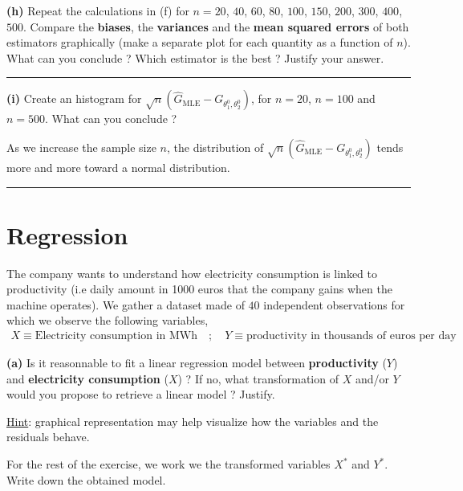 \documentclass[10pt, a4paper, nofootinbib]{scrartcl}
\begin{document}
\textbf{(h)} Repeat the calculations in (f) for $n = 20$, $40$, $60$, $80$, $100$, $150$, $200$, $300$, $400$, $500$. Compare the \textbf{biases}, the \textbf{variances} and the \textbf{mean squared errors} of both estimators graphically (make a separate plot for each quantity as a function of $n$). What can you conclude ? Which estimator is the best ? Justify your answer.

\begin{center}\rule{6cm}{0.4pt}\end{center}

\textbf{(i)} Create an histogram for $\sqrt{n}(\hat{G}_{\text{MLE}} - G_{\theta_1^0, \theta_2^0})$, for $n = 20$, $n = 100$ and $n = 500$. What can you conclude ?


As we increase the sample size $n$, the distribution of $\sqrt{n}(\hat{G}_{\text{MLE}} - G_{\theta_1^0, \theta_2^0})$ tends more and more toward a normal distribution.


\begin{center}\rule{6cm}{0.4pt}\end{center}

\section{Regression}

The company wants to understand how electricity consumption is linked to productivity (i.e daily amount in 1000 euros that the company gains when the machine operates). We gather a dataset made of $40$ independent observations for which we observe the following variables,
\begin{equation}
  \begin{array}{rl}
    X \equiv \text{Electricity consumption in MWh} \quad ; \quad Y \equiv \text{productivity in thousands of euros per day}
  \end{array}
\end{equation}

\textbf{(a)} Is it reasonnable to fit a linear regression model between \textbf{productivity} ($Y$) and \textbf{electricity consumption} ($X$) ? 
If no, what transformation of $X$ and/or $Y$ would you propose to retrieve a linear model ? Justify.

\underline{Hint}: graphical representation may help visualize how the variables and the residuals behave.

For the rest of the exercise, we work we the transformed variables $X^{\ast}$ and $Y^{\ast}$. 
Write down the obtained model.
\end{document}
